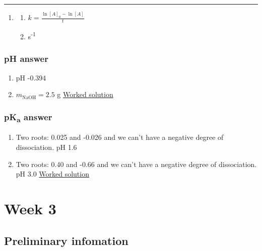 \documentclass[
]{book}
\providecommand{\tightlist}{%
  \setlength{\itemsep}{0pt}\setlength{\parskip}{0pt}}
\begin{document}
\begin{center}\rule{0.5\linewidth}{0.5pt}\end{center}

\begin{enumerate}
\def\labelenumi{\arabic{enumi}.}
\setcounter{enumi}{1}
\item
  \begin{enumerate}
  \def\labelenumii{\alph{enumii}.}
  \tightlist
  \item
    \(k=\frac{\ln [A]_0-\ln [A]}{t}\)
  \item
    s\textsuperscript{-1}
  \end{enumerate}
\end{enumerate}

\hypertarget{subsec:pHans}{%
\subsection{pH answer}\label{subsec:pHans}}

\begin{enumerate}
\def\labelenumi{\alph{enumi}.}
\tightlist
\item
  pH -0.394
\item
  \(m_{\textrm{NaOH}}=2.5\) g \href{https://www.youtube.com/embed/dg0o4N8nTxY}{Worked solution}
\end{enumerate}

\hypertarget{subsec:pKaans}{%
\subsection{\texorpdfstring{pK\textsubscript{a} answer}{pKa answer}}\label{subsec:pKaans}}

\begin{enumerate}
\def\labelenumi{\alph{enumi}.}
\tightlist
\item
  Two roots: 0.025 and -0.026 and we can't have a negative degree of dissociation.
  pH 1.6
\item
  Two roots: 0.40 and -0.66 and we can't have a negative degree of dissociation.
  pH 3.0 \href{https://www.youtube.com/embed/N9YhoXcQxnI}{Worked solution}
\end{enumerate}

\hypertarget{ch:Workshop3}{%
\chapter{Week 3}\label{ch:Workshop3}}

\hypertarget{sec:Prelim3}{%
\section{Preliminary infomation}\label{sec:Prelim3}}
\end{document}
